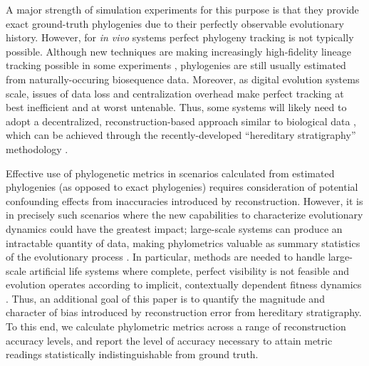 A major strength of simulation experiments for this purpose is that they provide exact ground-truth phylogenies due to their perfectly observable evolutionary history.
However, for \textit{in vivo} systems perfect phylogeny tracking is not typically possible. Although new techniques are making increasingly high-fidelity lineage tracking possible in some experiments \citep{nozoe2017inferring,woodworth2017building}, phylogenies are still usually estimated from naturally-occuring biosequence data.
Moreover, as digital evolution systems scale, issues of data loss and centralization overhead make perfect tracking at best inefficient and at worst untenable.
Thus, some systems will likely need to adopt a decentralized, reconstruction-based approach similar to biological data \citep{moreno2024analysis}, which can be achieved through the recently-developed ``hereditary stratigraphy'' methodology \citep{moreno2022hstrat}.

Effective use of phylogenetic metrics in scenarios calculated from estimated phylogenies (as opposed to exact phylogenies) requires consideration of potential confounding effects from inaccuracies introduced by reconstruction.
However, it is in precisely such scenarios where the new capabilities to characterize evolutionary dynamics could have the greatest impact; large-scale systems can produce an intractable quantity of data, making phylometrics valuable as summary statistics of the evolutionary process \citep{dolson2020interpreting}.
In particular, methods are needed to handle large-scale artificial life systems where complete, perfect visibility is not feasible and evolution operates according to implicit, contextually dependent fitness dynamics \citep{moreno2022exploring,kojima2023implementation}.
Thus, an additional goal of this paper is to quantify the magnitude and character of bias introduced by reconstruction error from hereditary stratigraphy.
To this end, we calculate phylometric metrics across a range of reconstruction accuracy levels, and report the level of accuracy necessary to attain metric readings statistically indistinguishable from ground truth.


